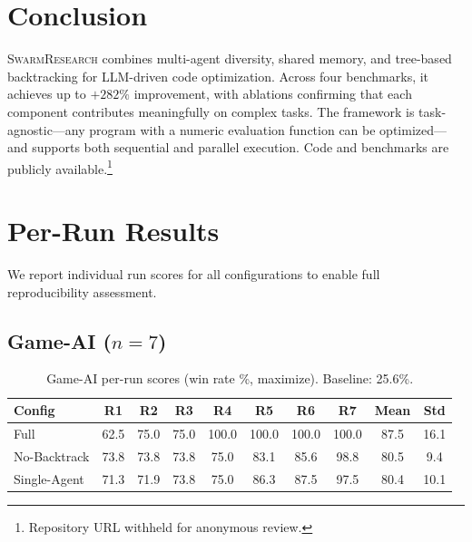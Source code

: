 \documentclass{article}
\begin{document}
\section{Conclusion}
\label{sec:conclusion}

\textsc{SwarmResearch} combines multi-agent diversity, shared memory, and tree-based backtracking for LLM-driven code optimization. Across four benchmarks, it achieves up to $+282\%$ improvement, with ablations confirming that each component contributes meaningfully on complex tasks. The framework is task-agnostic---any program with a numeric evaluation function can be optimized---and supports both sequential and parallel execution. Code and benchmarks are publicly available.\footnote{Repository URL withheld for anonymous review.}




\newpage
\appendix
\section{Per-Run Results}
\label{app:per_run}

We report individual run scores for all configurations to enable full reproducibility assessment.

\subsection{Game-AI ($n{=}7$)}

\begin{table}[h]
\centering
\caption{Game-AI per-run scores (win rate \%, maximize). Baseline: 25.6\%.}
\label{tab:gameai_runs}
\small
\begin{tabular}{@{}lccccccc|cc@{}}
\toprule
\textbf{Config} & \textbf{R1} & \textbf{R2} & \textbf{R3} & \textbf{R4} & \textbf{R5} & \textbf{R6} & \textbf{R7} & \textbf{Mean} & \textbf{Std} \\
\midrule
Full          & 62.5  & 75.0  & 75.0  & 100.0 & 100.0 & 100.0 & 100.0 & 87.5  & 16.1 \\
No-Backtrack  & 73.8  & 73.8  & 73.8  & 75.0  & 83.1  & 85.6  & 98.8  & 80.5  & 9.4  \\
Single-Agent  & 71.3  & 71.9  & 73.8  & 75.0  & 86.3  & 87.5  & 97.5  & 80.4  & 10.1 \\
\bottomrule
\end{tabular}
\end{table}
\end{document}
